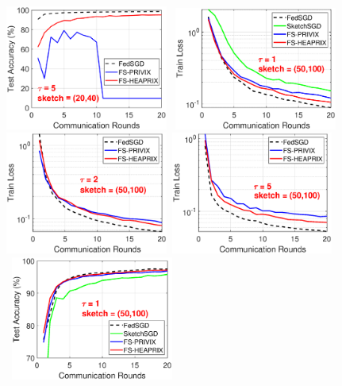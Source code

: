 \documentclass[twoside]{article}
\begin{document}
\begin{figure}[H]
\begin{center}
{		\includegraphics[width=2.1in]{MNIST_figures/local5_sketch20_iid1_test_acc.eps}
		}
		\mbox{			    \includegraphics[width=2.1in]{MNIST_figures/local1_sketch50_iid1_train_loss.eps} \hspace{-0.2in}
		\includegraphics[width=2.1in]{MNIST_figures/local2_sketch50_iid1_train_loss.eps} \hspace{-0.2in}
		\includegraphics[width=2.1in]{MNIST_figures/local5_sketch50_iid1_train_loss.eps}
		}
		\mbox{
		\includegraphics[width=2.1in]{MNIST_figures/local1_sketch50_iid1_test_acc.eps} \hspace{-0.2in}
}
\end{center}
\end{figure}
\end{document}
